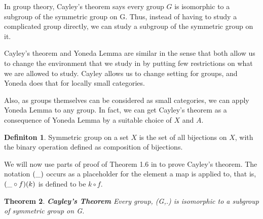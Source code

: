 \documentclass[18pt,a4paper]{article}
\newtheorem{theorem}{Theorem}[section]
\theoremstyle{definition}
\newtheorem{definition}[theorem]{Definiton}
\begin{document}
	In group theory, Cayley's theorem says every group $G$ is isomorphic to a subgroup of the symmetric
	group on G. Thus, instead of having to study a complicated group directly, we can study a subgroup of
	the symmetric group on it.

	Cayley's theorem and Yoneda Lemma are similar in the sense that both allow us to change the environment
	that we study in by putting few restrictions on what we are allowed to study. Cayley allows us to
	change setting for groups, and Yoneda does that for locally small categories.

	Also, as groups themselves can be considered as small categories, we can apply Yoneda Lemma to any
	group. In fact, we can get Cayley's theorem as a consequence of Yoneda Lemma by a suitable
	choice of $X$ and $A$.
	\begin{definition} %
		Symmetric group on a set $X$ is the set of all bijections on $X$, with the binary operation
		defined as composition of bijections.
	\end{definition}
	We will now use parts of proof of Theorem 1.6 in to prove Cayley's theorem. The notation $(\string _)$
	occurs as a placeholder for the element a map is applied to, that is, $(\string _ \circ f)(k)$ is
	defined to be $k \circ f$.
	\begin{theorem}{\textbf{Cayley's Theorem}} %
		Every group, (G,.) is isomorphic to a subgroup of symmetric group on G.
	\end{theorem}
\end{document}
